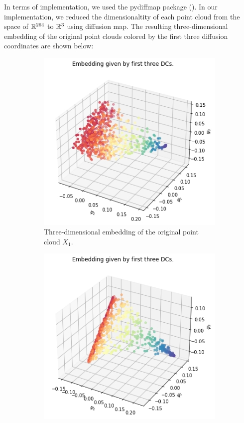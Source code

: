 In terms of implementation, we used the pydiffmap package (\cite{eastman_pydiffmap_2017}). In our implementation, we reduced the dimensionaltity of each point cloud from the space of $\mathbb R^{264}$ to $\mathbb R^3$ using diffusion map. The resulting three-dimensional embedding of the original point clouds colored by the first three diffusion coordinates are shown below:
\begin{figure}[H]
\centering
\begin{subfigure}[b]{0.3\textwidth}
    \includegraphics[width=\textwidth]{figures/X1_embedding.png}
    \caption{Three-dimensional embedding of the original point cloud $X_1$.}
\end{subfigure}
\hfill
\begin{subfigure}[b]{0.3\textwidth}
    \includegraphics[width=\textwidth]{figures/X2_embedding.png}

\end{subfigure}
\end{figure}
